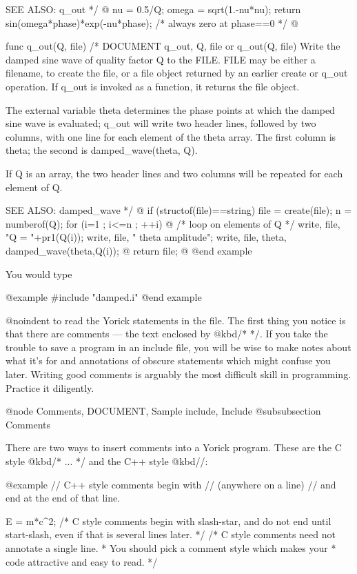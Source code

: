 {   SEE ALSO: q_out
 */
@{
  nu = 0.5/Q;
  omega = sqrt(1.-nu*nu);
  return sin(omega*phase)*exp(-nu*phase);  /* always zero at phase==0 */
@}

func q_out(Q, file)
/* DOCUMENT q_out, Q, file
         or q_out(Q, file)
     Write the damped sine wave of quality factor Q to the FILE.
     FILE may be either a filename, to create the file, or a file
     object returned by an earlier create or q_out operation.  If
     q_out is invoked as a function, it returns the file object.

     The external variable
          theta
     determines the phase points at which the damped sine wave is
     evaluated; q_out will write two header lines, followed by
     two columns, with one line for each element of the theta
     array.  The first column is theta; the second is
     damped_wave(theta, Q).

     If Q is an array, the two header lines and two columns will
     be repeated for each element of Q.

   SEE ALSO: damped_wave
 */
@{
  if (structof(file)==string) file = create(file);
  n = numberof(Q);
  for (i=1 ; i<=n ; ++i) @{ /* loop on elements of Q */
    write, file, "Q = "+pr1(Q(i));
    write, file, "   theta       amplitude";
    write, file, theta, damped_wave(theta,Q(i));
  @}
  return file;
@}
@end example

You would type

@example
#include "damped.i"
@end example

@noindent
to read the Yorick statements in the file.  The first thing you notice
is that there are comments --- the text enclosed by @kbd{/* */}.  If
you take the trouble to save a program in an include file, you will be
wise to make notes about what it's for and annotations of obscure
statements which might confuse you later.  Writing good comments is
arguably the most difficult skill in programming.  Practice it
diligently.


@node Comments, DOCUMENT, Sample include, Include
@subsubsection Comments

There are two ways to insert comments into a Yorick program.  These
are the C style @kbd{/* ... */} and the C++ style @kbd{//}:

@example
// C++ style comments begin with // (anywhere on a line)
// and end at the end of that line.

E = m*c^2;  /* C style comments begin with slash-star, and
               do not end until start-slash, even if that
               is several lines later.  */
/* C style comments need not annotate a single line.
 * You should pick a comment style which makes your
 * code attractive and easy to read.  */

}
